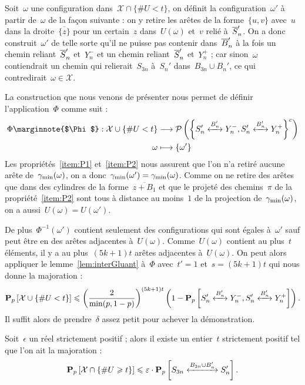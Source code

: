 			\begin{dem}
				Soit~$\omega$ une configuration dans~$\mathcal{X} \cap \{\# U < t\}$, on définit la configuration~$\omega'$ à partir de~$\omega$ de la façon suivante : on y retire les arêtes de la forme~$\{u,v\}$ avec~$u$ dans la droite~$\overline{\{z\}}$ pour un certain~$z$ dans~$U(\omega)$ et~$v$ relié à~$\SnB[n]'$.
				On a donc construit~$\omega'$ de telle sorte qu'il ne puisse pas contenir dans~$\BnB '$ à la fois un chemin reliant~$\SnB[n]'$ et~$Y_n^-$ et un chemin reliant~$\SnB[n]'$ et~$Y_n^+$ ; car sinon~$\omega$ contiendrait un chemin qui relierait~$S_{3n}$ à~$S_n'$ dans~$B_{3n}\cup B_n'$, ce qui contredirait~$\omega\in\mathcal{X}$.
			
				La construction que nous venons de présenter nous permet de définir l'application~$\Phi$ comme suit :
				\begin{align*}
					\Phi \marginnote{$\Phi$} : \mathcal{X}\cup\{\# U < t\} 	& \longrightarrow 	
											\mathcal{P}\left(
												\left\{\relie[B_n']{S_n'}{Y_n^-},
												\relie[B_n']{S_n'}{Y_n^+}\right\}^c
											\right)\\
						\omega				& \longmapsto 		\{\omega'\}
				\end{align*}	
				Les propriétés~\ref{item:P1} et~\ref{item:P2} nous assurent que l'on n'a retiré aucune arête de~$\Cmin$, on a donc~$\Cmin[\omega'] = \Cmin$. Comme on ne retire des arêtes que dans des cylindres de la forme~$\overline{z+B_1}$ et que le projeté des chemins~$\pi$ de la propriété~\ref{item:P2} sont tous à distance au moins~$1$ de la projection de~$\Cmin$, on a aussi~$U(\omega) = U(\omega')$.

				De plus~$\Phi^{-1}(\omega')$ contient seulement des configurations qui sont égales à~$\omega'$ sauf peut être en des arêtes adjacentes à~$U(\omega)$. Comme~$U(\omega)$ contient au plus~$t$ éléments, il y a au plus~$(5k+1)t$ arêtes adjacentes à~$U(\omega)$. On peut alors appliquer le lemme~\ref{lem:interGluant} à~$\Phi$ avec~$t'=1$ et~$s=(5k+1)t$ qui nous donne la majoration :
				\[
						\Pp{\mathcal{X}\cup\{\#U < t\}}
					\leq
						\left(
							\frac{2}{\min(p,1-p)}
						\right)^{(5k+1)t}
						\left( 1 - \Pp{\relie[B_n']{S_n'}{Y_n^-}, \relie[B_n']{S_n'}{Y_n^+}}\right).
				\]
				Il suffit alors de prendre~$\delta$ assez petit pour achever la démonstration.
			\end{dem}
			\begin{prop}\label{prop:Ugrand}
				Soit~$\epsilon$ un réel strictement positif ; alors il existe un entier~$t$ strictement positif tel que l'on ait la majoration :
				\[
						\Pp{\mathcal{X}\cap\{\# U \geq t\}} 
					\leq 
						\epsilon
						\cdot
						\Pp{\relie[B_{3n}\cup B_n']{S_{3n}}{S_n'}}.
				\]
			\end{prop}
